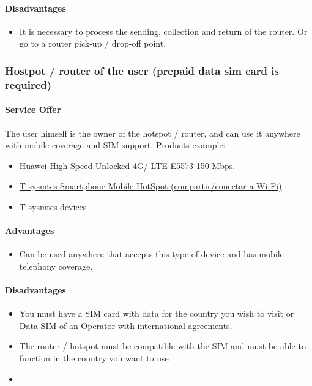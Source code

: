\documentclass[12pt]{report}
\begin{document}
  \paragraph*{Disadvantages}
  \begin{itemize}
    \item It is necessary to process the sending, collection and return of the router. Or go to a
    router pick-up / drop-off point.
  \end{itemize}


  \subsubsection{Hostpot / router of the user (prepaid data sim card is required)} \label{ch:router-ownership}

  \paragraph*{Service Offer}
  The user himself is the owner of the hotspot / router, and can use it anywhere with mobile coverage and SIM support.
  Products example:
  \begin{itemize}
    \item Huawei High Speed Unlocked 4G/ LTE E5573 150 Mbps.
    \item \href{https://es.support.t-mobile.com/docs/DOC-2384}{T-sysmtes Smartphone Mobile HotSpot (compartir/conectar a Wi-Fi)}
    \item \href{https://es.support.t-mobile.com/community/phones-tablets-devices#hotspot/}{T-sysmtes devices}
  \end{itemize}

  \paragraph*{Advantages}
  \begin{itemize}
    \item Can be used anywhere that accepts this type of device and has mobile telephony coverage.
  \end{itemize}

  \paragraph*{Disadvantages}
  \begin{itemize}
    \item You must have a SIM card with data for the country you wish to visit or Data SIM of an Operator with international agreements.
    \item The router / hotspot must be compatible with the SIM and must be able to function in the country you want to use
    \item
  \end{itemize}
\end{document}
